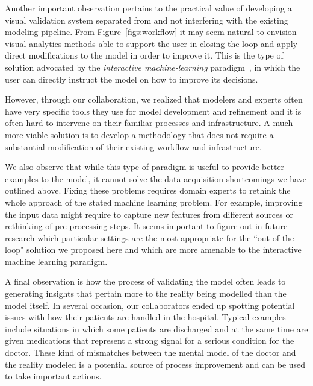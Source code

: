 

Another important observation pertains to the practical value of developing a visual validation system separated from and not interfering with the existing modeling pipeline. From Figure~\ref{figs:workflow} it may seem natural to envision visual analytics methods able to support the user in closing the loop and apply direct modifications to the model in order to improve it. This is the type of solution advocated by the \textit{interactive machine-learning} paradigm~\cite{amershi2014power}, in which the user can directly instruct the model on how to improve its decisions.

However, through our collaboration, we realized that modelers and experts often have very specific tools they use for model development and refinement and it is often hard to intervene on their familiar processes and infrastructure. A much more viable solution is to develop a methodology that does not require a substantial modification of their existing workflow and infrastructure.

We also observe that while this type of paradigm is useful to provide better examples to the model, it cannot solve the data acquisition shortcomings we have outlined above. Fixing these problems requires domain experts to rethink the whole approach of the stated machine learning problem. For example, improving the input data might require to capture new features from different sources or rethinking of pre-processing steps.
It seems important to figure out in future research which particular settings are the most appropriate for the ``out of the loop" solution we proposed here and which are more amenable to the interactive machine learning paradigm.

A final observation is how the process of validating the model often leads to generating insights that pertain more to the reality being modelled than the model itself. In several occasion, our collaborators ended up spotting potential issues with how their patients are handled in the hospital. Typical examples include situations in which some patients are discharged and at the same time are given medications that represent a strong signal for a serious condition for the doctor.
These kind of mismatches between the mental model of the doctor and the reality modeled is a potential source of process improvement and can be used to take important actions.

